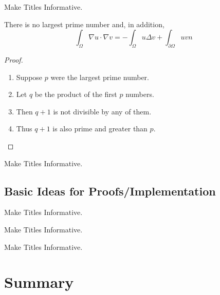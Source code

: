 \documentclass[ucs,8pt]{beamer}
\begin{document}
\begin{frame}{Make Titles Informative.}
\begin{theorem}
 There is no largest prime number and, in addition, $$\int_\Omega \nabla u \cdot \nabla v = - \int_\Omega u \Delta v + \int_{\partial\Omega} u v n$$
 \end{theorem}
 \begin{proof}
 \begin{enumerate}
 \item<1-> Suppose $p$ were the largest prime number.
 \item<2-> Let $q$ be the product of the first $p$ numbers.
 \item<3-> Then $q + 1$ is not divisible by any of them.
 \item<1-> Thus $q + 1$ is also prime and greater than $p$.\qedhere
 \end{enumerate} 
 \end{proof}
\end{frame}

\begin{frame}{Make Titles Informative.}
\end{frame}


\subsection{Basic Ideas for Proofs/Implementation}

\begin{frame}{Make Titles Informative.}
\end{frame}

\begin{frame}{Make Titles Informative.}
\end{frame}

\begin{frame}{Make Titles Informative.}
\end{frame}



\section*{Summary}
\end{document}
